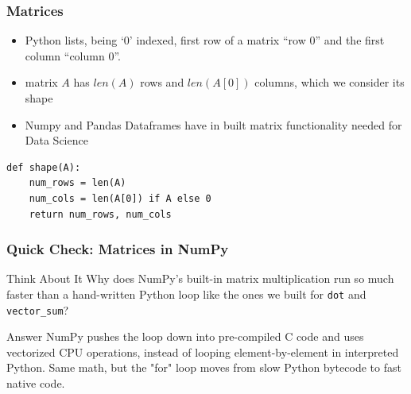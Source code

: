 \begin{frame}[fragile]\frametitle{Matrices}
\begin{itemize}
\item  Python lists, being `0' indexed, first row of a matrix ``row 0'' and the first column ``column 0''.
\item  matrix  $A$  has  $len(A)$  rows and  $len(A[0])$ columns, which we consider its  shape
\item Numpy and Pandas Dataframes have in built matrix functionality needed for Data Science
\end{itemize}
\begin{lstlisting}
def shape(A):
    num_rows = len(A)
    num_cols = len(A[0]) if A else 0
    return num_rows, num_cols
\end{lstlisting}
\end{frame}

\begin{frame}[fragile]\frametitle{Quick Check: Matrices in NumPy}
\begin{block}{Think About It}
Why does NumPy's built-in matrix multiplication run so much faster than a hand-written Python loop like the ones we built for \lstinline|dot| and \lstinline|vector_sum|?
\end{block}
\pause
\begin{block}{Answer}
NumPy pushes the loop down into pre-compiled C code and uses vectorized CPU operations, instead of looping element-by-element in interpreted Python. Same math, but the "for" loop moves from slow Python bytecode to fast native code.
\end{block}
\end{frame}
